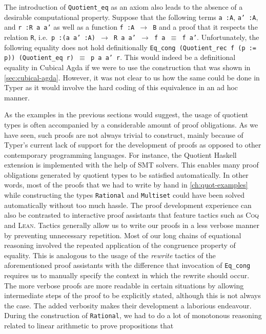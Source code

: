 \documentclass[12pt,twoside,maitrise]{dms}
\theoremstyle{definition}
\numberwithin{equation}{section}
\numberwithin{table}{chapter}
\numberwithin{figure}{chapter}
\newcommand\id[1] {\texttt{#1}}
\newcommand\fn[1] {\texttt{#1}}
\def\Coq{\textsc{Coq}\xspace}
\def\Lean{\textsc{Lean}\xspace}
\begin{document}
The introduction of \id{Quotient\_eq} as an axiom also leads to the absence of a
desirable computational property. Suppose that the following terms \fn{a :\@ A},
\fn{a' :\@ A}, and \fn{r :\@ R a a'} as well as a function \fn{f :\@ A $\rightarrow$
  B} and a proof that it respects the relation \id{R}, i.e.\ \fn{p :\@ (a a' :\@ A)
  $\rightarrow$ R a a' $\rightarrow$ f a $\equiv$ f a'}. Unfortunately, the
following equality does not hold definitionally \fn{Eq\_cong (Quotient\_rec f (p
  := p)) (Quotient\_eq r) $\equiv$ p a a' r}. This would indeed be a
definitional equality in Cubical Agda if we were to use the construction that
was shown in \autoref{sec:cubical-agda}. However, it was not clear to us how the
same could be done in Typer as it would involve the hard coding of this
equivalence in an ad hoc manner.

As the examples in the previous sections would suggest, the usage of quotient
types is often accompanied by a considerable amount of proof obligations. As we
have seen, such proofs are not always trivial to construct, mainly because of
Typer's current lack of support for the development of proofs as opposed to
other contemporary programming languages. For instance, the Quotient Haskell
extension\cite{hewer2023quotient} is implemented with the help of SMT solvers. This enables many proof obligations generated by
quotient types to be satisfied automatically. In other words, most of the proofs
that we had to write by hand in \autoref{ch:quot-examples} while constructing
the types \id{Rational} and \id{Multiset} could have been solved automatically
without too much hassle. The proof development experience can also be contrasted
to interactive proof assistants that feature tactics such as \Coq{} and \Lean{}.
Tactics generally allow us to write our proofs in a less verbose manner by
preventing unnecessary repetition. Most of our long chains of equational
reasoning involved the repeated application of the congruence property of
equality. This is analogous to the usage of the \emph{rewrite} tactics of the
aforementioned proof assistants with the difference that invocation of
\id{Eq\_cong} requires us to manually specify the context in which the rewrite
should occur. The more verbose proofs are more readable in certain situations by
allowing intermediate steps of the proof to be explicitly stated, although this
is not always the case. The added verbosity makes their development a laborious
endeavour. During the construction of \id{Rational}, we had to do a lot of
monotonous reasoning related to linear arithmetic to prove propositions that
\end{document}
